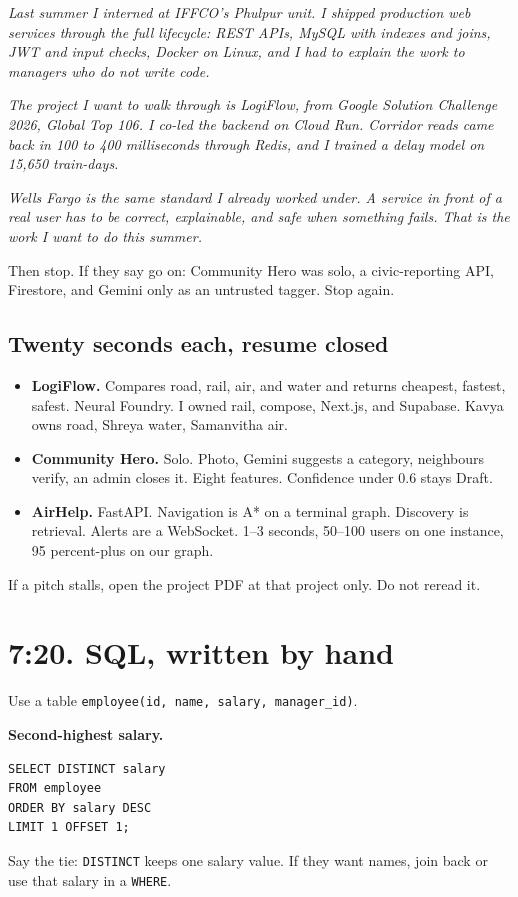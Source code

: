 \documentclass[a4paper,9.5pt]{extarticle}
\begin{document}
\textit{Last summer I interned at IFFCO's Phulpur unit. I shipped production web services through the full lifecycle: REST APIs, MySQL with indexes and joins, JWT and input checks, Docker on Linux, and I had to explain the work to managers who do not write code.}

\textit{The project I want to walk through is LogiFlow, from Google Solution Challenge 2026, Global Top 106. I co-led the backend on Cloud Run. Corridor reads came back in 100 to 400 milliseconds through Redis, and I trained a delay model on 15{,}650 train-days.}

\textit{Wells Fargo is the same standard I already worked under. A service in front of a real user has to be correct, explainable, and safe when something fails. That is the work I want to do this summer.}

\noindent Then stop. If they say go on: Community Hero was solo, a civic-reporting API, Firestore, and Gemini only as an untrusted tagger. Stop again.

\subsection{Twenty seconds each, resume closed}
\begin{itemize}
  \item \textbf{LogiFlow.} Compares road, rail, air, and water and returns cheapest, fastest, safest. Neural Foundry. I owned rail, compose, Next.js, and Supabase. Kavya owns road, Shreya water, Samanvitha air.
  \item \textbf{Community Hero.} Solo. Photo, Gemini suggests a category, neighbours verify, an admin closes it. Eight features. Confidence under 0.6 stays Draft.
  \item \textbf{AirHelp.} FastAPI. Navigation is A* on a terminal graph. Discovery is retrieval. Alerts are a WebSocket. 1--3 seconds, 50--100 users on one instance, 95 percent-plus on our graph.
\end{itemize}
If a pitch stalls, open the project PDF at that project only. Do not reread it.

\section{7:20. SQL, written by hand}
Use a table \texttt{employee(id, name, salary, manager\_id)}.

\textbf{Second-highest salary.}
\begin{verbatim}
SELECT DISTINCT salary
FROM employee
ORDER BY salary DESC
LIMIT 1 OFFSET 1;
\end{verbatim}
Say the tie: \texttt{DISTINCT} keeps one salary value. If they want names, join back or use that salary in a \texttt{WHERE}.
\end{document}
